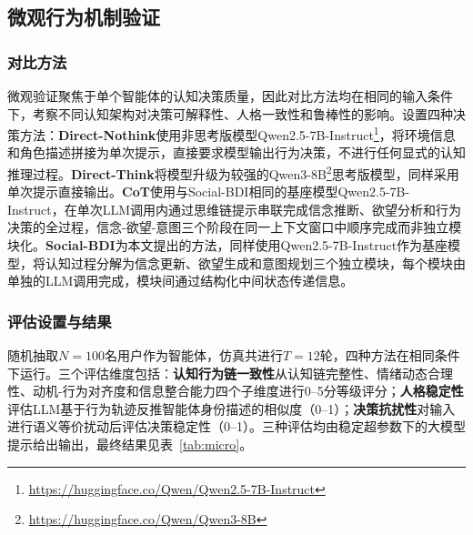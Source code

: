 \documentclass[a4paper,fleqn]{cas-dc}
\begin{document}
\subsection{微观行为机制验证}\label{subsec:micro}


\subsubsection{对比方法}

微观验证聚焦于单个智能体的认知决策质量，因此对比方法均在相同的输入条件下，考察不同认知架构对决策可解释性、人格一致性和鲁棒性的影响。设置四种决策方法：\textbf{Direct-Nothink}使用非思考版模型Qwen2.5-7B-Instruct\footnote{\url{https://huggingface.co/Qwen/Qwen2.5-7B-Instruct}}，将环境信息和角色描述拼接为单次提示，直接要求模型输出行为决策，不进行任何显式的认知推理过程。\textbf{Direct-Think}将模型升级为较强的Qwen3-8B\footnote{\url{https://huggingface.co/Qwen/Qwen3-8B}}思考版模型，同样采用单次提示直接输出。\textbf{CoT}使用与Social-BDI相同的基座模型Qwen2.5-7B-Instruct，在单次LLM调用内通过思维链提示串联完成信念推断、欲望分析和行为决策的全过程，信念-欲望-意图三个阶段在同一上下文窗口中顺序完成而非独立模块化。\textbf{Social-BDI}为本文提出的方法，同样使用Qwen2.5-7B-Instruct作为基座模型，将认知过程分解为信念更新、欲望生成和意图规划三个独立模块，每个模块由单独的LLM调用完成，模块间通过结构化中间状态传递信息。

\subsubsection{评估设置与结果}

随机抽取$N=100$名用户作为智能体，仿真共进行$T=12$轮，四种方法在相同条件下运行。三个评估维度包括：\textbf{认知行为链一致性}从认知链完整性、情绪动态合理性、动机-行为对齐度和信息整合能力四个子维度进行0--5分等级评分；\textbf{人格稳定性}评估LLM基于行为轨迹反推智能体身份描述的相似度（0--1）；\textbf{决策抗扰性}对输入进行语义等价扰动后评估决策稳定性（0--1）。三种评估均由稳定超参数下的大模型提示给出输出，最终结果见表~\ref{tab:micro}。
\end{document}
